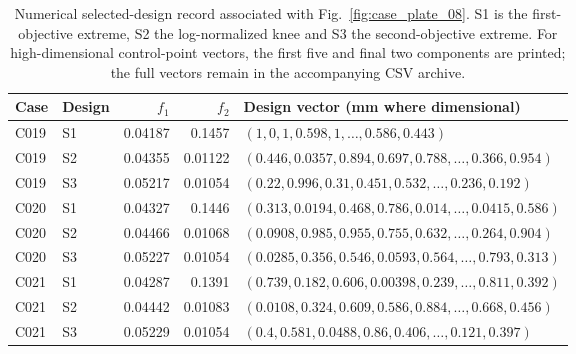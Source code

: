\begin{table}[p]
\centering\scriptsize
\caption{Numerical selected-design record associated with Fig.~\ref{fig:case_plate_08}. S1 is the first-objective extreme, S2 the log-normalized knee and S3 the second-objective extreme. For high-dimensional control-point vectors, the first five and final two components are printed; the full vectors remain in the accompanying CSV archive.}
\label{tab:case_plate_08}
\setlength{\tabcolsep}{3.2pt}
\begin{tabularx}{\textwidth}{llrr>{\raggedright\arraybackslash}X}
\toprule Case & Design & $f_1$ & $f_2$ & Design vector (mm where dimensional) \\
\midrule
C019 & S1 & 0.04187 & 0.1457 & $(1, 0, 1, 0.598, 1, \ldots, 0.586, 0.443)$ \\
C019 & S2 & 0.04355 & 0.01122 & $(0.446, 0.0357, 0.894, 0.697, 0.788, \ldots, 0.366, 0.954)$ \\
C019 & S3 & 0.05217 & 0.01054 & $(0.22, 0.996, 0.31, 0.451, 0.532, \ldots, 0.236, 0.192)$ \\
C020 & S1 & 0.04327 & 0.1446 & $(0.313, 0.0194, 0.468, 0.786, 0.014, \ldots, 0.0415, 0.586)$ \\
C020 & S2 & 0.04466 & 0.01068 & $(0.0908, 0.985, 0.955, 0.755, 0.632, \ldots, 0.264, 0.904)$ \\
C020 & S3 & 0.05227 & 0.01054 & $(0.0285, 0.356, 0.546, 0.0593, 0.564, \ldots, 0.793, 0.313)$ \\
C021 & S1 & 0.04287 & 0.1391 & $(0.739, 0.182, 0.606, 0.00398, 0.239, \ldots, 0.811, 0.392)$ \\
C021 & S2 & 0.04442 & 0.01083 & $(0.0108, 0.324, 0.609, 0.586, 0.884, \ldots, 0.668, 0.456)$ \\
C021 & S3 & 0.05229 & 0.01054 & $(0.4, 0.581, 0.0488, 0.86, 0.406, \ldots, 0.121, 0.397)$ \\
\bottomrule
\end{tabularx}
\end{table}
